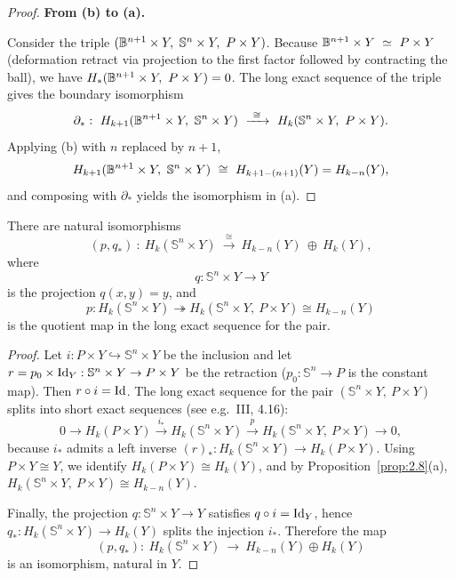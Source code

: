 \begin{proof}
\smallskip
\textbf{From (b) to (a).}

Consider the triple $(\B^{n+1}\times Y,\ \mathbb{S}^n\times Y,\ P\times Y)$.
Because $\mathbb{B}^{n+1}\times Y\ \simeq\ P\times Y$ (deformation retract via projection to the
first factor followed by contracting the ball), we have
$H_*(\mathbb{B}^{n+1}\times Y,\ P\times Y)=0$. The long exact sequence of the triple gives the
boundary isomorphism
\[
\partial_*:\ H_{k+1}(\B^{n+1}\times Y,\ \mathbb{S}^n\times Y)\ \xrightarrow{\ \cong\ }\
H_k(\mathbb{S}^n\times Y,\ P\times Y).
\]
Applying (b) with $n$ replaced by $n{+}1$,
\[
H_{k+1}(\B^{n+1}\times Y,\ \mathbb{S}^n\times Y)\ \cong\ H_{k+1-(n+1)}(Y)=H_{k-n}(Y),
\]
and composing with $\partial_*$ yields the isomorphism in (a).
\end{proof}

\begin{corollary}\label{cor:2.17}
There are natural isomorphisms
\[
(p,q_*)\ :\ H_k(\mathbb{S}^n\times Y)\ \xrightarrow{\ \cong\ }\
H_{k-n}(Y)\ \oplus\ H_k(Y),
\]
where \[q:\mathbb{S}^n\times Y\to Y\] is the projection $q(x,y)=y$, and
\[p:H_k(\mathbb{S}^n\times Y)\twoheadrightarrow H_k(\mathbb{S}^n\times Y,\ P\times Y)\cong H_{k-n}(Y)\]
is the quotient map in the long exact sequence for the pair.
\end{corollary}

\begin{proof}
Let $i:P\times Y\hookrightarrow \mathbb{S}^n\times Y$ be the inclusion and let
$r=p_0\times \operatorname{Id}_Y:\mathbb{S}^n\times Y\to P\times Y$ be the retraction
($p_0:\mathbb{S}^n\to P$ is the constant map). Then $r\circ i=\operatorname{Id}$.
The long exact sequence for the pair $(\mathbb{S}^n\times Y,\ P\times Y)$ splits into short exact
sequences (see e.g.\ III, 4.16):
\[
0\longrightarrow H_k(P\times Y)
\xrightarrow{i_*} H_k(\mathbb{S}^n\times Y)
\xrightarrow{p} H_k(\mathbb{S}^n\times Y,\ P\times Y)
\longrightarrow 0,
\]
because $i_*$ admits a left inverse $(r)_*:H_k(\mathbb{S}^n\times Y)\to H_k(P\times Y)$.
Using $P\times Y\cong Y$, we identify $H_k(P\times Y)\cong H_k(Y)$, and by
Proposition~\ref{prop:2.8}(a),
$H_k(\mathbb{S}^n\times Y,\ P\times Y)\cong H_{k-n}(Y)$.

Finally, the projection $q:\mathbb{S}^n\times Y\to Y$ satisfies $q\circ i=\operatorname{Id}_Y$, hence
$q_*:H_k(\mathbb{S}^n\times Y)\to H_k(Y)$ splits the injection $i_*$. Therefore the map
\[
(p,q_*):\ H_k(\mathbb{S}^n\times Y)\ \longrightarrow\ H_{k-n}(Y)\oplus H_k(Y)
\]
is an isomorphism, natural in $Y$.
\end{proof}


